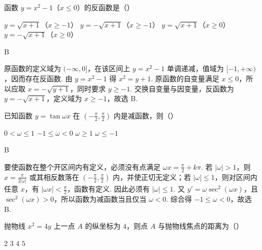 \begin{problem}
函数 \( y = x^{2} - 1 \)（\(x \leqslant 0\)）的反函数是（\quad）

\choices
    {\( y = \sqrt{x + 1} \)（\(x \geqslant -1\)）}
    {\( y = -\sqrt{x + 1} \)（\(x \geqslant -1\)）}
    {\( y = \sqrt{x + 1} \)（\(x \geqslant 0\)）}
    {\( y = -\sqrt{x + 1} \)（\(x \geqslant 0\)）}
\end{problem}

\begin{answer}B\end{answer}

\begin{solution}
原函数的定义域为 \((-\infty,0]\)，在该区间上 \(y=x^{2}-1\) 单调递减，值域为 \([-1,+\infty)\)，因而存在反函数. 由 \(y=x^{2}-1\) 得 \(x^{2}=y+1\). 原函数的自变量满足 \(x\leqslant0\)，所以应取 \(x=-\sqrt{y+1}\)，同时要求 \(y\geqslant-1\). 交换自变量与因变量，反函数为 \(y=-\sqrt{x+1}\)，定义域为 \(x\geqslant-1\)，故选 B.
\end{solution}

\begin{problem}
已知函数 \( y = \tan \omega x \) 在 \(\left(-\frac{\pi}{2}, \frac{\pi}{2}\right)\) 内是减函数，则（\quad）

\choices
    {\(0 < \omega \leqslant 1\)}
    {\(-1 \leqslant \omega < 0\)}
    {\(\omega \geqslant 1\)}
    {\(\omega \leqslant -1\)}
\end{problem}

\begin{answer}B\end{answer}

\begin{solution}
要使函数在整个开区间内有定义，必须没有点满足 \(\omega x=\frac{\pi}{2}+k\pi\). 若 \(|\omega|>1\)，则 \(x=\frac{\pi}{2|\omega|}\) 或其相反数落在 \(\left(-\frac{\pi}{2},\frac{\pi}{2}\right)\) 内，并使正切无定义；若 \(|\omega|\leqslant1\)，则对区间内任意 \(x\)，有 \(|\omega x|<\frac{\pi}{2}\)，函数有定义. 因此必须有 \(|\omega|\leqslant1\). 又 \(y'=\omega\sec^{2}(\omega x)\)，且 \(\sec^{2}(\omega x)>0\)，所以函数为减函数当且仅当 \(\omega<0\). 综合得 \(-1\leqslant\omega<0\)，故选 B.
\end{solution}

\begin{problem}
抛物线 \(x^{2} = 4y\) 上一点 \(A\) 的纵坐标为 \(4\)，则点 \(A\) 与抛物线焦点的距离为（\quad）

\choices
    {\(2\)}
    {\(3\)}
    {\(4\)}
    {\(5\)}
\end{problem}

